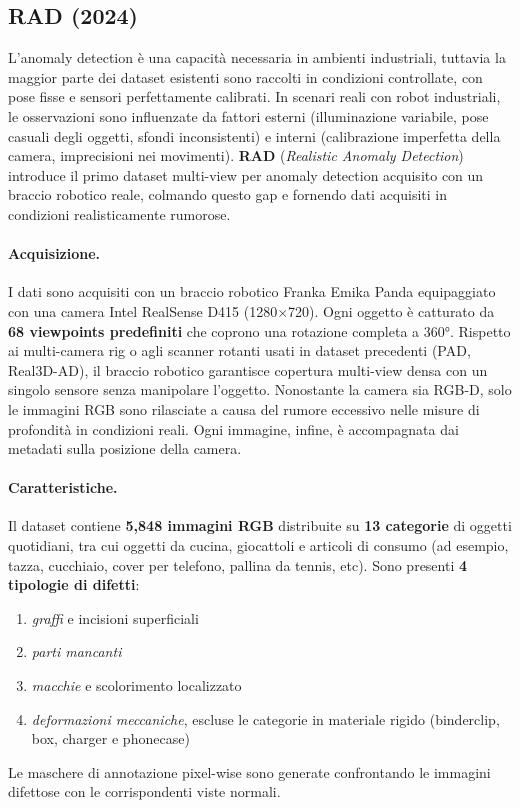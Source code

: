 \subsection{RAD (2024)}
\label{sec:rad}

L'anomaly detection è una capacità necessaria in ambienti industriali, tuttavia la maggior parte dei dataset esistenti sono raccolti in condizioni controllate, con pose fisse e sensori perfettamente calibrati. In scenari reali con robot industriali, le osservazioni sono influenzate da fattori esterni (illuminazione variabile, pose casuali degli oggetti, sfondi inconsistenti) e interni (calibrazione imperfetta della camera, imprecisioni nei movimenti). \textbf{RAD} (\textit{Realistic Anomaly Detection}) \cite{zhou2024rad} introduce il primo dataset multi-view per anomaly detection acquisito con un braccio robotico reale, colmando questo gap e fornendo dati acquisiti in condizioni realisticamente rumorose.

\paragraph{Acquisizione.} I dati sono acquisiti con un braccio robotico Franka Emika Panda equipaggiato con una camera Intel RealSense D415 (1280$\times$720). Ogni oggetto è catturato da \textbf{68 viewpoints predefiniti} che coprono una rotazione completa a 360°. Rispetto ai multi-camera rig o agli scanner rotanti usati in dataset precedenti (PAD, Real3D-AD), il braccio robotico garantisce copertura multi-view densa con un singolo sensore senza manipolare l'oggetto. Nonostante la camera sia RGB-D, solo le immagini RGB sono rilasciate a causa del rumore eccessivo nelle misure di profondità in condizioni reali. Ogni immagine, infine, è accompagnata dai metadati sulla posizione della camera.

\paragraph{Caratteristiche.} Il dataset contiene \textbf{5,848 immagini RGB} distribuite su \textbf{13 categorie} di oggetti quotidiani, tra cui oggetti da cucina, giocattoli e articoli di consumo (ad esempio, tazza, cucchiaio, cover per telefono, pallina da tennis, etc). Sono presenti \textbf{4 tipologie di difetti}: 
\begin{enumerate}
    \item \textit{graffi} e incisioni superficiali
    \item \textit{parti mancanti}
    \item \textit{macchie} e scolorimento localizzato
    \item \textit{deformazioni meccaniche}, escluse le categorie in materiale rigido (binderclip, box, charger e phonecase)
\end{enumerate}
Le maschere di annotazione pixel-wise sono generate confrontando le immagini difettose con le corrispondenti viste normali.

